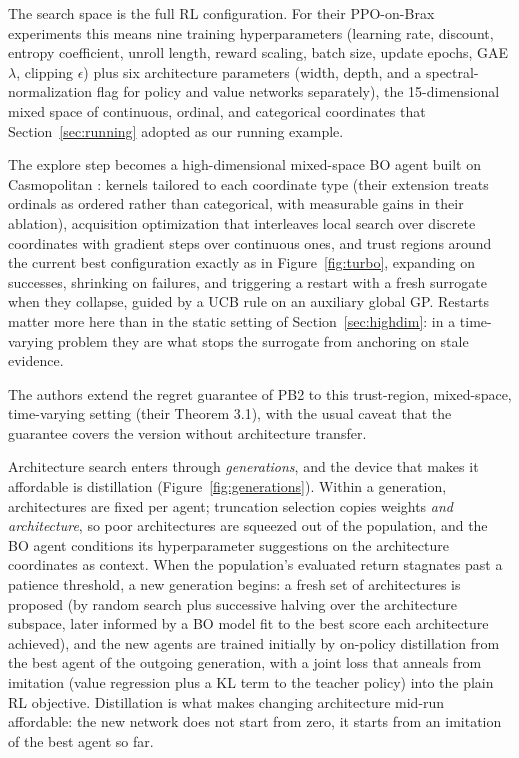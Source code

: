 The search space is the full RL configuration. For their PPO-on-Brax
experiments this means nine training hyperparameters (learning rate,
discount, entropy coefficient, unroll length, reward scaling, batch size,
update epochs, GAE $\lambda$, clipping $\epsilon$) plus six architecture
parameters (width, depth, and a spectral-normalization flag for policy
and value networks separately), the 15-dimensional mixed space of
continuous, ordinal, and categorical coordinates that
Section~\ref{sec:running} adopted as our running example.

The explore
step becomes a high-dimensional mixed-space BO agent built on
Casmopolitan \citep{wan2021casmopolitan}: kernels tailored to each
coordinate type (their extension treats ordinals as ordered rather than
categorical, with measurable gains in their ablation), acquisition
optimization that interleaves local search over discrete coordinates
with gradient steps over continuous ones, and trust regions around the
current best configuration exactly as in Figure~\ref{fig:turbo},
expanding on successes, shrinking on failures, and triggering a restart
with a fresh surrogate when they collapse, guided by a UCB rule on an
auxiliary global GP. Restarts matter more here than in the static
setting of Section~\ref{sec:highdim}: in a time-varying problem they are
what stops the surrogate from anchoring on stale evidence.

The authors
extend the regret guarantee of PB2 to this trust-region, mixed-space,
time-varying setting (their Theorem 3.1), with the usual caveat that
the guarantee covers the version without architecture transfer.

Architecture search enters through \emph{generations}, and the device
that makes it affordable is distillation
(Figure~\ref{fig:generations}). Within a generation, architectures are
fixed per agent; truncation selection copies weights \emph{and
architecture}, so poor architectures are squeezed out of the population,
and the BO agent conditions its hyperparameter suggestions on the
architecture coordinates as context. When the population's evaluated
return stagnates past a patience threshold, a new generation begins: a
fresh set of architectures is proposed (by random search plus successive
halving over the architecture subspace, later informed by a BO model fit
to the best score each architecture achieved), and the new agents are
trained initially by on-policy distillation from the best agent of the
outgoing generation, with a joint loss that anneals from imitation
(value regression plus a KL term to the teacher policy) into the plain
RL objective. Distillation is what makes changing architecture mid-run
affordable: the new network does not start from zero, it starts from an
imitation of the best agent so far.

